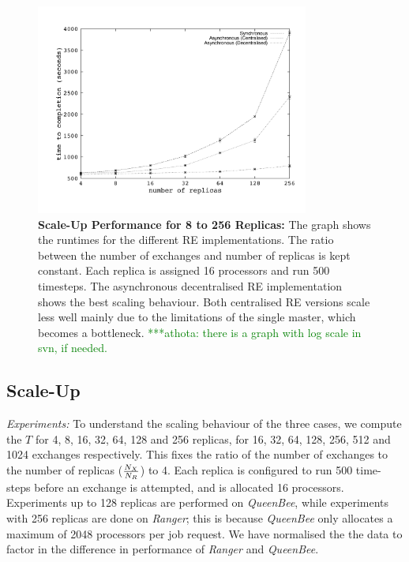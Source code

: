 \documentclass{rspublic}
\newcommand{\alnote}[1]{ {\textcolor{blue} { ***andre: #1 }}}
\newcommand{\athotanote}[1]{ {\textcolor{green} { ***athota: #1 }}}
\newcommand{\alnote}[1]{}
\newcommand{\athotanote}[1]{}
\begin{document}
%
\begin{figure}
\centering
\includegraphics[width=0.8\textwidth]{../data/scale_up.pdf}
\caption{\small \textbf{Scale-Up Performance for 8 to 256 Replicas:}
  The graph shows the runtimes for the different RE implementations.
  The ratio between the number of exchanges and number of replicas is kept constant. Each replica is assigned 16 processors and run 500 timesteps. 
  The asynchronous decentralised RE implementation shows the best
  scaling behaviour. Both centralised RE versions scale less well
  mainly due to the limitations of the single master, which becomes a
  bottleneck.\athotanote{there is a graph with log scale in svn, if needed.} }
\label{fig:scaleup}
\vspace{-1em}
\end{figure}


\subsection{Scale-Up}


{\it Experiments: } To understand the scaling behaviour of the three
cases, we compute the $T$ for 4, 8, 16, 32, 64, 128 and 256 replicas,
for 16, 32, 64, 128, 256, 512 and 1024 exchanges respectively. This
fixes the ratio of the number of exchanges to the number of replicas
($N_X \over N_R$) to 4.  Each replica is configured to run 500 time-steps
before an exchange is attempted, and is allocated 16
processors. Experiments up to 128 replicas are performed on {\it
  QueenBee}, while experiments with 256 replicas are done on
\emph{Ranger}; this is because \emph{QueenBee} only allocates a
maximum of 2048 processors per job request. We have normalised the the
data to factor in the difference in performance of {\it Ranger} and
{\it QueenBee}.
\end{document}
